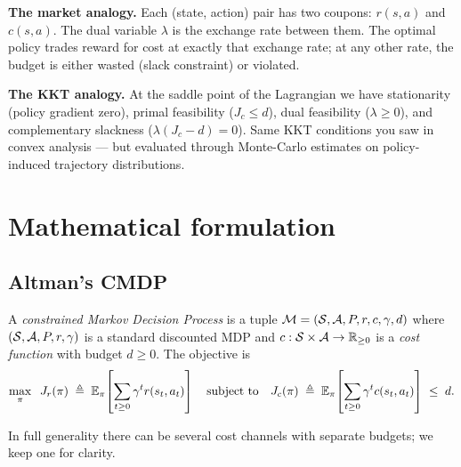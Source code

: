 \documentclass[11pt,oneside]{scrbook}
\begin{document}
\begin{intuition}\textbf{The market analogy.}
Each (state, action) pair has two coupons: $r(s,a)$ and $c(s,a)$. The dual
variable $\lambda$ is the exchange rate between them. The optimal policy
trades reward for cost at exactly that exchange rate; at any other rate, the
budget is either wasted (slack constraint) or violated.
\end{intuition}

\begin{intuition}\textbf{The KKT analogy.}
At the saddle point of the Lagrangian we have stationarity (policy gradient
zero), primal feasibility ($J_c \leq d$), dual feasibility ($\lambda \geq 0$),
and complementary slackness ($\lambda (J_c - d) = 0$). Same KKT conditions you
saw in convex analysis --- but evaluated through Monte-Carlo estimates on
policy-induced trajectory distributions.
\end{intuition}

\chapter{Mathematical formulation}

\section{Altman's CMDP}

\begin{definition}\label{def:cmdp}
A \emph{constrained Markov Decision Process} is a tuple
$\mathcal{M} = (\mathcal{S}, \mathcal{A}, P, r, c, \gamma, d)$ where
$(\mathcal{S}, \mathcal{A}, P, r, \gamma)$ is a standard discounted MDP and
$c : \mathcal{S} \times \mathcal{A} \to \mathbb{R}_{\geq 0}$ is a \emph{cost function}
with budget $d \geq 0$. The objective is
\[
   \max_\pi\;\; J_r(\pi) \;\triangleq\; \mathbb{E}_\pi\!\left[\sum_{t \geq 0} \gamma^t r(s_t, a_t)\right]
   \quad \text{subject to} \quad
   J_c(\pi) \;\triangleq\; \mathbb{E}_\pi\!\left[\sum_{t \geq 0} \gamma^t c(s_t, a_t)\right] \;\leq\; d.
\]
\end{definition}

In full generality there can be several cost channels with separate budgets;
we keep one for clarity.
\end{document}

